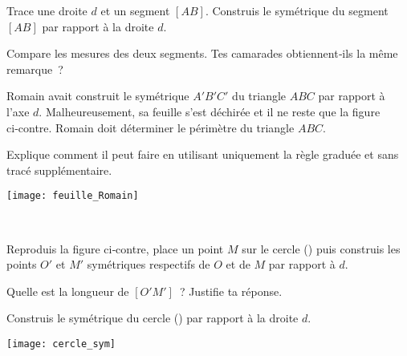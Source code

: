 \begin{activite}

\begin{partie}
\begin{enumerate}
 \item Trace une droite $d$ et un segment $[AB]$. Construis le symétrique du segment $[AB]$ par rapport à la droite $d$.
 \item Compare les mesures des deux segments. Tes camarades obtiennent‑ils la même remarque ?
 
 \begin{minipage}[c]{0.52\linewidth}
 \item Romain avait construit le symétrique $A'B'C'$ du triangle $ABC$ par rapport à l'axe $d$. Malheureusement, sa feuille s'est déchirée et il ne reste que la figure ci‑contre. Romain doit déterminer le périmètre du triangle $ABC$. 
 
Explique comment il peut faire en utilisant uniquement la règle graduée et sans tracé supplémentaire.
  \end{minipage}
   \qquad \begin{minipage}[c]{0.46\linewidth}
  \texttt{[image: feuille\_Romain]}
  \end{minipage} \\
 \end{enumerate}
\end{partie}

\begin{partie}
\begin{enumerate}
 \begin{minipage}[c]{0.62\linewidth}
 \item Reproduis la figure ci‑contre, place un point $M$ sur le cercle (\phantom{...}) puis construis les points $O'$ et $M'$ symétriques respectifs de $O$ et de $M$ par rapport à $d$.
 
Quelle est la longueur de $[O'M']$ ? Justifie ta réponse.
 \item Construis le symétrique du cercle (\phantom{...}) par rapport à la droite $d$.
  \end{minipage}
   \qquad \begin{minipage}[c]{0.36\linewidth}
  \texttt{[image: cercle\_sym]}
  \end{minipage} \\
 \end{enumerate}
\end{partie}

\end{activite}

